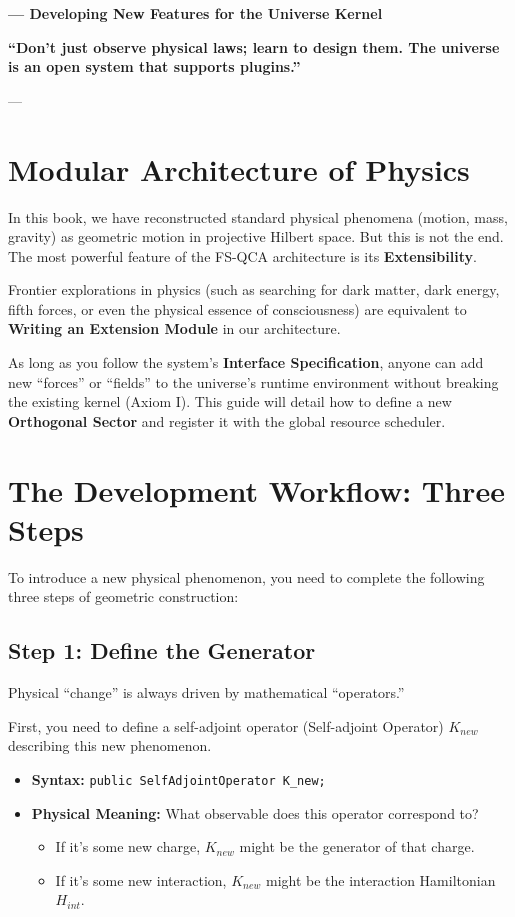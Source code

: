 \documentclass[11pt,a4paper,twoside]{book}
\begin{document}
\textbf{--- Developing New Features for the Universe Kernel}

\textbf{``Don't just observe physical laws; learn to design them. The universe is an open system that supports plugins.''}

---

\section{Modular Architecture of Physics}

In this book, we have reconstructed standard physical phenomena (motion, mass, gravity) as geometric motion in projective Hilbert space. But this is not the end. The most powerful feature of the FS-QCA architecture is its \textbf{Extensibility}.

Frontier explorations in physics (such as searching for dark matter, dark energy, fifth forces, or even the physical essence of consciousness) are equivalent to \textbf{Writing an Extension Module} in our architecture.

As long as you follow the system's \textbf{Interface Specification}, anyone can add new ``forces'' or ``fields'' to the universe's runtime environment without breaking the existing kernel (Axiom I). This guide will detail how to define a new \textbf{Orthogonal Sector} and register it with the global resource scheduler.

\section{The Development Workflow: Three Steps}

To introduce a new physical phenomenon, you need to complete the following three steps of geometric construction:

\subsection{Step 1: Define the Generator}

Physical ``change'' is always driven by mathematical ``operators.''

First, you need to define a self-adjoint operator (Self-adjoint Operator) \textbf{$K_{new}$} describing this new phenomenon.

\begin{itemize}
\item \textbf{Syntax:} \texttt{public SelfAdjointOperator K\_new;}

\item \textbf{Physical Meaning:} What observable does this operator correspond to?

\begin{itemize}
\item If it's some new charge, $K_{new}$ might be the generator of that charge.

\item If it's some new interaction, $K_{new}$ might be the interaction Hamiltonian $H_{int}$.
\end{itemize}
\end{itemize}
\end{document}

